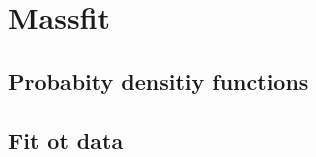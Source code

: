 \chapter{Massfit}
\label{ch:massfit}

\blindtext

\section{Probabity densitiy functions}

\Blindtext

\section{Fit ot data}

\Blindtext
